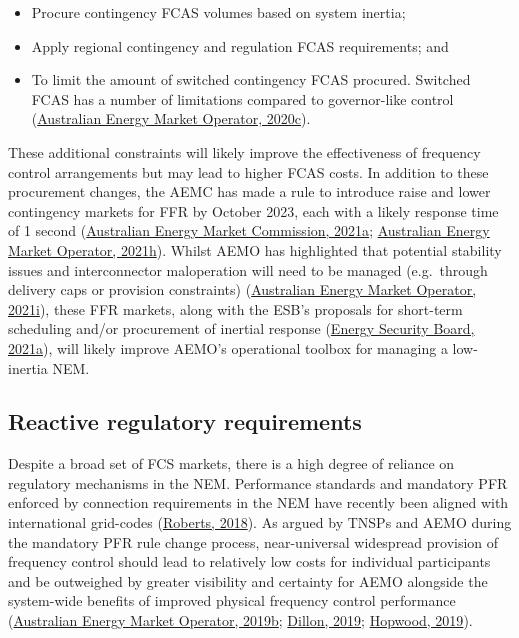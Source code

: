 \documentclass[12pt,a4paper,]{report}
\providecommand{\tightlist}{%
  \setlength{\itemsep}{0pt}\setlength{\parskip}{0pt}}
\begin{document}
\begin{itemize}
\tightlist
\item
  Procure contingency FCAS volumes based on system inertia;
\item
  Apply regional contingency and regulation FCAS requirements; and
\item
  To limit the amount of switched contingency FCAS procured. Switched
  FCAS has a number of limitations compared to governor-like control
  (\protect\hyperlink{ref-australianenergymarketoperatorRenewableIntegrationStudy2020c}{Australian
  Energy Market Operator, 2020c}).
\end{itemize}

These additional constraints will likely improve the effectiveness of
frequency control arrangements but may lead to higher FCAS costs. In
addition to these procurement changes, the AEMC has made a rule to
introduce raise and lower contingency markets for FFR by October 2023,
each with a likely response time of 1 second
(\protect\hyperlink{ref-australianenergymarketcommissionFastFrequencyResponse2021}{Australian
Energy Market Commission, 2021a};
\protect\hyperlink{ref-australianenergymarketoperatorFastFrequencyResponse2021}{Australian
Energy Market Operator, 2021h}). Whilst AEMO has highlighted that
potential stability issues and interconnector maloperation will need to
be managed (e.g.~through delivery caps or provision constraints)
(\protect\hyperlink{ref-australianenergymarketoperatorImplementationNationalElectricity2021}{Australian
Energy Market Operator, 2021i}), these FFR markets, along with the ESB's
proposals for short-term scheduling and/or procurement of inertial
response
(\protect\hyperlink{ref-energysecurityboardPost2025Market2021}{Energy
Security Board, 2021a}), will likely improve AEMO's operational toolbox
for managing a low-inertia NEM.

\hypertarget{reactive-regulatory-requirements}{%
\subsection{Reactive regulatory
requirements}\label{reactive-regulatory-requirements}}

Despite a broad set of FCS markets, there is a high degree of reliance
on regulatory mechanisms in the NEM. Performance standards and mandatory
PFR enforced by connection requirements in the NEM have recently been
aligned with international grid-codes
(\protect\hyperlink{ref-robertsReviewInternationalGrid2018}{Roberts,
2018}). As argued by TNSPs and AEMO during the mandatory PFR rule change
process, near-universal widespread provision of frequency control should
lead to relatively low costs for individual participants and be
outweighed by greater visibility and certainty for AEMO alongside the
system-wide benefits of improved physical frequency control performance
(\protect\hyperlink{ref-australianenergymarketoperatorElectricityRuleChange2019}{Australian
Energy Market Operator, 2019b};
\protect\hyperlink{ref-dillonMandatoryPrimaryFrequency2019}{Dillon,
2019};
\protect\hyperlink{ref-hopwoodMandatoryPrimaryFrequency2019}{Hopwood,
2019}).
\end{document}
